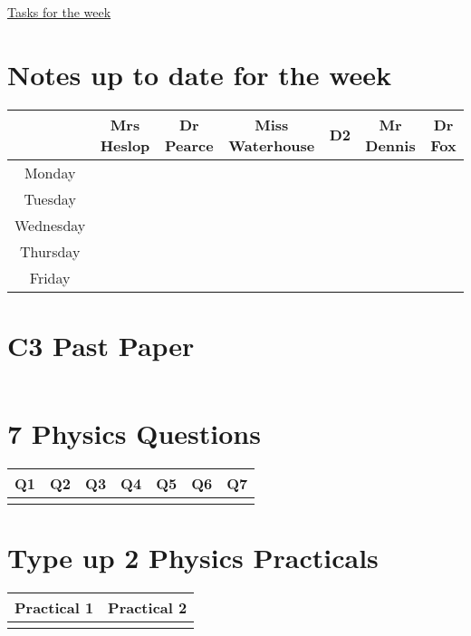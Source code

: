\documentclass{article}[18pt]
\begin{document}
\begin{center}
\underline{\huge Tasks for the week}
\end{center}
\section{Notes up to date for the week}
{\renewcommand{\arraystretch}{1.2}
\begin{tabular}{ |c|c|c|c|c|c|c| }
\hline
&Mrs Heslop&Dr Pearce&Miss Waterhouse&D2&Mr Dennis&Dr Fox\\
\hline
Monday&&&&&&\\
\hline
Tuesday&&&&&&\\
\hline
Wednesday&&&&&&\\
\hline
Thursday&&&&&&\\
\hline
Friday&&&&&&\\
\hline
\end{tabular}
}
\section{C3 Past Paper}
{\renewcommand{\arraystretch}{1.2}
\begin{tabular}{|c|}
\hline
\\
\hline
\end{tabular}
}
\section{7 Physics Questions}
{\renewcommand{\arraystretch}{1.2}
\begin{tabular}{ |c|c|c|c|c|c|c| }
\hline
Q1&Q2&Q3&Q4&Q5&Q6&Q7\\
\hline
&&&&&&\\
\hline
\end{tabular}
}
\section{Type up 2 Physics Practicals}
{\renewcommand{\arraystretch}{1.2}
\begin{tabular}{ |c|c| }
\hline
Practical 1&Practical 2\\
\hline
&\\
\hline
\end{tabular}
}
\end{document}
